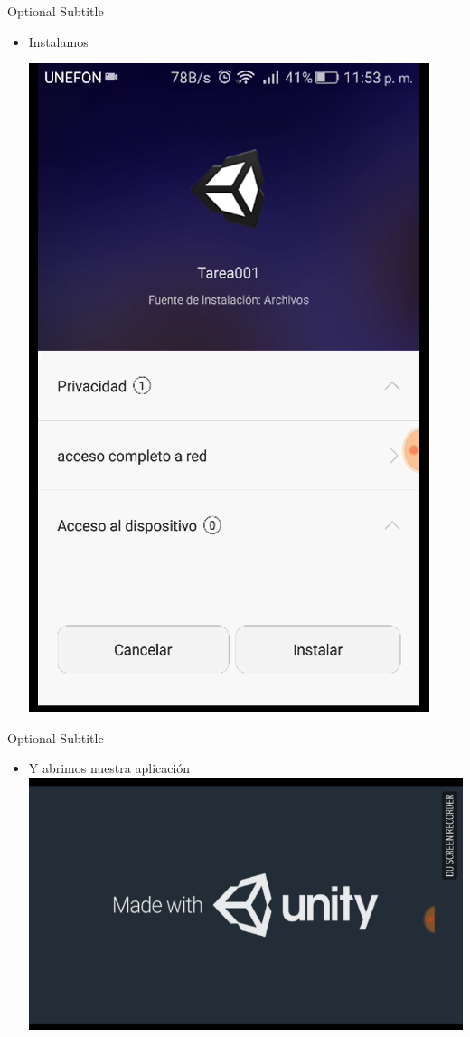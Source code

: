 \documentclass{beamer}
\begin{document}
\begin{frame}{37}{Optional Subtitle}
  \begin{itemize}
  \item {
    Instalamos
  }
  
  \includegraphics[height=0.7\paperheight]{image/IU37}
  \centering
  \end{itemize}
\end{frame}

\begin{frame}{38}{Optional Subtitle}
  \begin{itemize}
  \item {
   Y abrimos nuestra aplicación
  }
  \includegraphics[width=\linewidth]{image/IU38}
  \end{itemize}
\end{frame}
\end{document}
